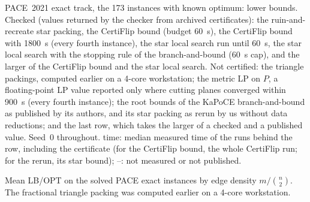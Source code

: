 \begin{table}[!tbp]
\centering
\caption{PACE~2021 exact track, the 173 instances with known optimum: lower
bounds.  Checked (values returned by the checker from archived
certificates): the ruin-and-recreate star packing, the CertiFlip bound
(budget \SI{60}{s}), the CertiFlip bound with \SI{1800}{s} (every fourth
instance), the star local search run until \SI{60}{s}, the star local search
with the stopping rule of the branch-and-bound (\SI{60}{s} cap), and the
larger of the CertiFlip bound and the star local search.  Not certified: the
triangle packings, computed earlier on a 4-core workstation; the metric LP on
$P$, a floating-point LP value reported only where cutting planes converged
within \SI{900}{s} (every fourth instance); the root bounds of the KaPoCE
branch-and-bound as published by its authors, and its star packing as rerun
by us without data reductions; and the last row, which takes the larger of a
checked and a published value.  Seed~0 throughout.  time: median measured
time of the runs behind the row, including the certificate (for the
CertiFlip bound, the whole CertiFlip run; for the rerun, its star bound);
--: not measured or not published.}
\label{tab:pace-bounds}
\footnotesize
\setlength{\tabcolsep}{4pt}
\begin{adjustbox}{max width=\textwidth}\end{adjustbox}
\end{table}

\begin{table}[!tbp]
\centering
\caption{Mean LB/OPT on the solved PACE exact instances by edge density
$m/\binom n2$.  The fractional triangle packing was computed earlier on a
4-core workstation.}
\label{tab:pace-density}
\footnotesize
\setlength{\tabcolsep}{4pt}
\begin{adjustbox}{max width=\textwidth}\end{adjustbox}
\end{table}

